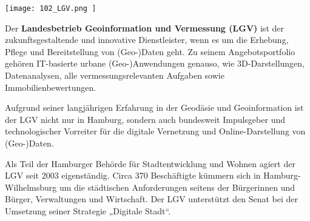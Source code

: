 \begin{flushright}
\texttt{[image: 102\_LGV.png ]}
\end{flushright}
\noindent
Der {\bfseries Landesbetrieb Geoinformation und Vermessung (LGV)} ist der zukunftsgestaltende und innovative Dienstleister, wenn es um die Erhebung, Pflege und Bereitstellung von (Geo-)Daten geht. Zu seinem Angebotsportfolio gehören IT-basierte urbane (Geo-)Anwendungen genauso, wie 3D-Darstellungen, Datenanalysen, alle vermessungsrelevanten Aufgaben sowie Immobilienbewertungen.

\noindent
Aufgrund seiner langjährigen Erfahrung in der Geodäsie und Geoinformation ist der LGV nicht nur in Hamburg, sondern auch bundesweit Impulsgeber und technologischer Vorreiter für die digitale Vernetzung und Online-Darstellung von (Geo-)Daten.

\noindent
Als Teil der Hamburger Behörde für Stadtentwicklung und Wohnen agiert der LGV seit 2003 eigenständig. Circa 370 Beschäftigte kümmern sich in Hamburg-Wilhelmsburg um die städtischen Anforderungen seitens der Bürgerinnen und Bürger, Verwaltungen und Wirtschaft. Der LGV unterstützt den Senat bei der Umsetzung seiner Strategie „Digitale Stadt“.

